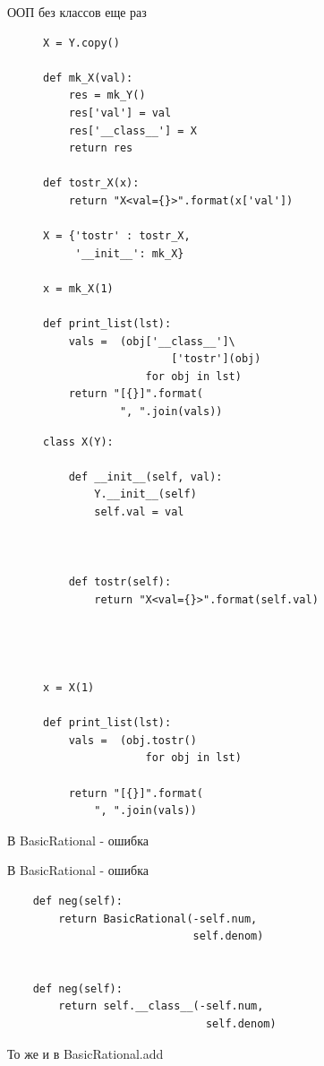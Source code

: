 \documentclass{article}
\begin{document}
\begin{center} ООП без классов еще раз \end{center}
\begin{figure}[ht]
\begin{minipage}[b]{0.45\linewidth}
\large
\begin{lstlisting}
X = Y.copy()

def mk_X(val):
    res = mk_Y()
    res['val'] = val
    res['__class__'] = X
    return res

def tostr_X(x):
    return "X<val={}>".format(x['val'])

X = {'tostr' : tostr_X,
     '__init__': mk_X}

x = mk_X(1)

def print_list(lst):
    vals =  (obj['__class__']\
                    ['tostr'](obj)
                for obj in lst)
    return "[{}]".format(
            ", ".join(vals))
\end{lstlisting}
\end{minipage}
\hspace{2cm}
\begin{minipage}[b]{0.45\linewidth}
\large
\begin{lstlisting}
class X(Y):
 
    def __init__(self, val):
        Y.__init__(self)
        self.val = val



    def tostr(self):
        return "X<val={}>".format(self.val)




x = X(1)

def print_list(lst):
    vals =  (obj.tostr() 
                for obj in lst)
    
    return "[{}]".format(
        ", ".join(vals))
\end{lstlisting}
\end{minipage}
\end{figure}
\newpage

\begin{center} В BasicRational - ошибка \end{center}
\newpage

\begin{center} В BasicRational - ошибка \end{center}
\begin{lstlisting}
    def neg(self):
        return BasicRational(-self.num,
                             self.denom)


    def neg(self):
        return self.__class__(-self.num,
                               self.denom)
\end{lstlisting}
То же и в BasicRational.add
\newpage
\end{document}
